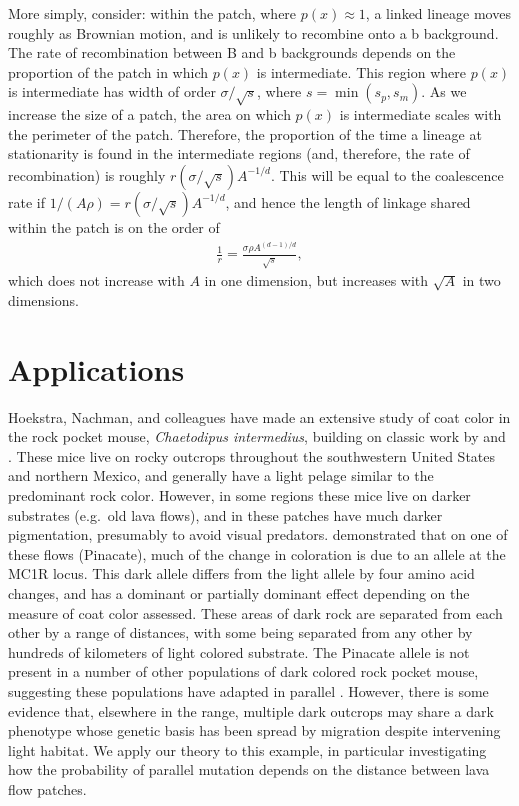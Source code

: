 \documentclass{article}
\begin{document}
More simply, consider: within the patch, where $p(x) \approx 1$, 
a linked lineage moves roughly as Brownian motion, and is unlikely to recombine onto a b background.
The rate of recombination between B and b backgrounds depends on the proportion of the patch in which $p(x)$ is intermediate.
This region where $p(x)$ is intermediate has width of order $\sigma/\sqrt{s}$, where $s = \min(s_p,s_m)$.
As we increase the size of a patch, the area on which $p(x)$ is intermediate scales with the perimeter of the patch.
Therefore, the proportion of the time a lineage at stationarity is found in the intermediate regions
(and, therefore, the rate of recombination)
is roughly $r (\sigma/\sqrt{s})A^{-1/d}$.
This will be equal to the coalescence rate if
$1/(A\rho) = r (\sigma/\sqrt{s}) A^{-1/d}$, 
and hence the length of linkage shared within the patch is on the order of
\begin{align}
  \frac{1}{r} = \frac{ \sigma \rho A^{(d-1)/d} }{\sqrt{s}} ,
\end{align}
which does not increase with $A$ in one dimension,
but increases with $\sqrt{A}$ in two dimensions.



\section{Applications} 
Hoekstra, Nachman, and colleagues have made an extensive study of coat color in the rock pocket mouse, 
\emph{Chaetodipus intermedius}, building on classic work by \citet{benson1933concealing} and \citet{dice1940ecologic}.
These mice live on rocky outcrops throughout the southwestern United States and northern Mexico, 
and generally have a light pelage similar to the predominant rock color.
However, in some regions these mice live on darker substrates (e.g.\ old lava flows),
and in these patches have much darker pigmentation, 
presumably to avoid visual predators.
\citet{nachman2003different} demonstrated that on one of these flows (Pinacate), 
much of the change in coloration is due to an allele at the MC1R locus.
This dark allele differs from the light allele by four amino acid changes, 
and has a dominant or partially dominant effect depending on the measure of coat color assessed. 
These areas of dark rock are separated from each other by a range of distances, 
with some being separated from any other by hundreds of kilometers of light colored substrate. 
The Pinacate allele is not present in a number of other populations of dark colored rock pocket mouse, 
suggesting these populations have adapted in parallel \citep{xxx}.
However, there is some evidence \citep{Hoekstra:05} that, elsewhere in the range, 
multiple dark outcrops may share a dark phenotype whose genetic basis has been spread by migration
despite intervening light habitat. 
We apply our theory to this example,
in particular investigating how the probability of parallel mutation depends on 
the distance between lava flow patches.
\end{document}

